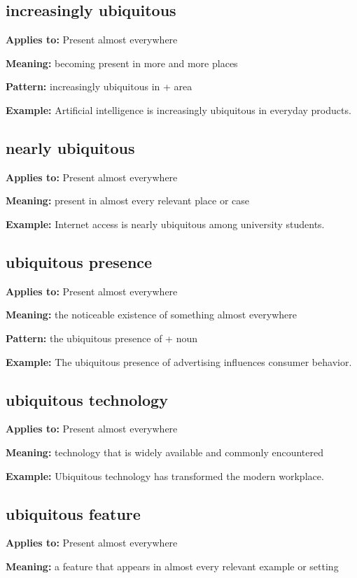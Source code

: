 \documentclass[11pt]{article}
\begin{document}
\subsection{increasingly ubiquitous}
\textbf{Applies to:} Present almost everywhere

\textbf{Meaning:} becoming present in more and more places

\textbf{Pattern:} increasingly ubiquitous in + area

\textbf{Example:} Artificial intelligence is increasingly ubiquitous in everyday products.

\subsection{nearly ubiquitous}
\textbf{Applies to:} Present almost everywhere

\textbf{Meaning:} present in almost every relevant place or case

\textbf{Example:} Internet access is nearly ubiquitous among university students.

\subsection{ubiquitous presence}
\textbf{Applies to:} Present almost everywhere

\textbf{Meaning:} the noticeable existence of something almost everywhere

\textbf{Pattern:} the ubiquitous presence of + noun

\textbf{Example:} The ubiquitous presence of advertising influences consumer behavior.

\subsection{ubiquitous technology}
\textbf{Applies to:} Present almost everywhere

\textbf{Meaning:} technology that is widely available and commonly encountered

\textbf{Example:} Ubiquitous technology has transformed the modern workplace.

\subsection{ubiquitous feature}
\textbf{Applies to:} Present almost everywhere

\textbf{Meaning:} a feature that appears in almost every relevant example or setting
\end{document}

